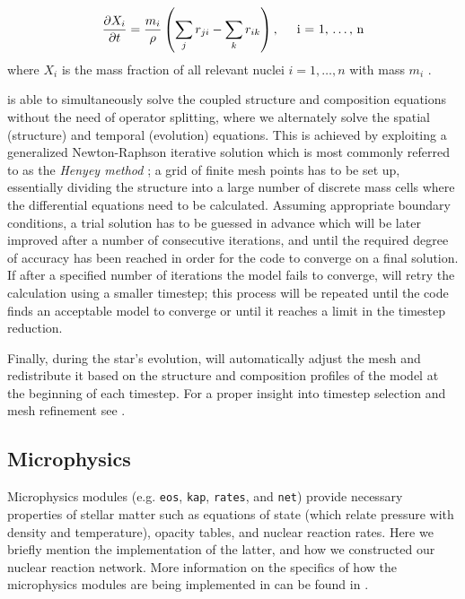 \documentclass[../../main/thesis_msc.tex]{subfiles}
\begin{document}
				\begin{align} \label{eq:composition}
					 \frac{\partial X_i}{\partial t} = \frac{m_i}{\rho} \left( \sum_j r_{ji} - \sum_k r_{ik} \right), \hspace{0.5cm} \text{i = 1, $\dots$, n}
				\end{align}
				where $X_i$ is the mass fraction of all relevant nuclei $i = 1, \dots , n$ with mass $m_i$ \cite[][p. 89]{Kipp_book}.
				
    			
    			\mesa is able to simultaneously solve the coupled structure and composition equations without the need of operator splitting, where we alternately solve the spatial (structure) and temporal (evolution) equations. This is achieved by exploiting a generalized Newton-Raphson iterative solution which is most commonly referred to as the \emph{Henyey method} \citep[][p. 106]{Wilson1981, Kipp_book}; a grid of finite mesh points has to be set up, essentially dividing the structure into a large number of discrete mass cells where the differential equations need to be calculated. Assuming appropriate boundary conditions, a trial solution has to be guessed in advance which will be later improved after a number of consecutive iterations, and until the required degree of accuracy has been reached in order for the code to converge on a final solution. If after a specified number of iterations the model fails to converge, \mesa will retry the calculation using a smaller timestep; this process will be repeated until the code finds an acceptable model to converge or until it reaches a limit in the timestep reduction.
    			
    			Finally, during the star's evolution, \mesa will automatically adjust the mesh and redistribute it based on the structure and composition profiles of the model at the beginning of each timestep. For a proper insight into timestep selection and mesh refinement see \cite{Paxton2011}.
    			
    		
			\subsection{Microphysics}
				Microphysics modules (e.g. \texttt{eos}, \texttt{kap}, \texttt{rates}, and \texttt{net}) provide necessary properties of stellar matter such as equations of state (which relate pressure with density and temperature), opacity tables, and nuclear reaction rates. Here we briefly mention the implementation of the latter, and how we constructed our nuclear reaction network. More information on the specifics of how the microphysics modules are being implemented in \mesa can be found in \cite{Paxton2011}.
			
\end{document}
